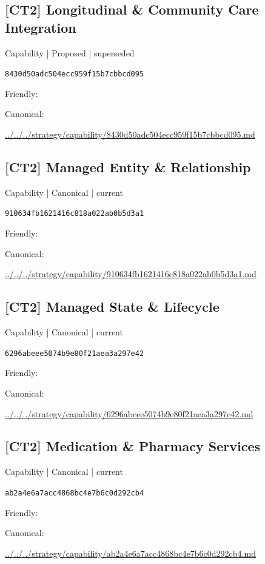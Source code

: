 \documentclass[10pt,a4paper]{article}
\begin{document}
\subsection*{[CT2] Longitudinal \& Community Care Integration}
{\small Capability | Proposed | superseded}\par
\texttt{8430d50adc504ecc959f15b7cbbcd095}\par
Friendly: \par
Canonical: \par
{\footnotesize\url{../../../strategy/capability/8430d50adc504ecc959f15b7cbbcd095.md}}\par
\subsection*{[CT2] Managed Entity \& Relationship}
{\small Capability | Canonical | current}\par
\texttt{910634fb1621416c818a022ab0b5d3a1}\par
Friendly: \par
Canonical: \par
{\footnotesize\url{../../../strategy/capability/910634fb1621416c818a022ab0b5d3a1.md}}\par
\subsection*{[CT2] Managed State \& Lifecycle}
{\small Capability | Canonical | current}\par
\texttt{6296abeee5074b9e80f21aea3a297e42}\par
Friendly: \par
Canonical: \par
{\footnotesize\url{../../../strategy/capability/6296abeee5074b9e80f21aea3a297e42.md}}\par
\subsection*{[CT2] Medication \& Pharmacy Services}
{\small Capability | Canonical | current}\par
\texttt{ab2a4e6a7acc4868bc4e7b6c0d292cb4}\par
Friendly: \par
Canonical: \par
{\footnotesize\url{../../../strategy/capability/ab2a4e6a7acc4868bc4e7b6c0d292cb4.md}}\par
\end{document}
